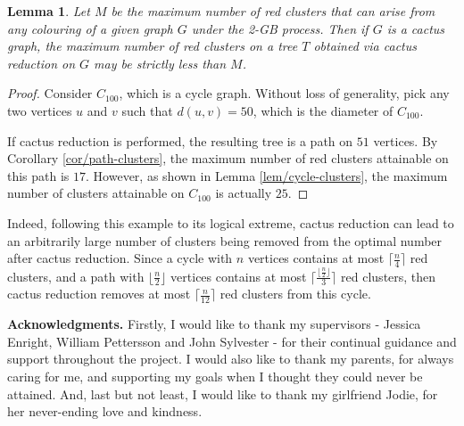 \documentclass{mpaper}
\newtheorem{lemma}[theorem]{Lemma}
\begin{document}
\begin{lemma}
  Let $M$ be the maximum number of red clusters that can arise from any colouring of a given graph $G$ under the 2-GB process. Then if $G$ is a cactus graph, the maximum number of red clusters on a tree $T$ obtained via cactus reduction on $G$ may be strictly less than $M$.
\end{lemma}

\begin{proof}
  Consider $C_100$, which is a cycle graph. Without loss of generality, pick any two vertices $u$ and $v$ such that $d(u,v) = 50$, which is the diameter of $C_100$.

  If cactus reduction is performed, the resulting tree is a path on $51$ vertices. By Corollary \ref{cor/path-clusters}, the maximum number of red clusters attainable on this path is $17$. However, as shown in Lemma \ref{lem/cycle-clusters}, the maximum number of clusters attainable on $C_100$ is actually $25$.

\end{proof}

Indeed, following this example to its logical extreme, cactus reduction can lead to an arbitrarily large number of clusters being removed from the optimal number after cactus reduction. Since a cycle with $n$ vertices contains at most $\lceil \frac{n}{4} \rceil$ red clusters, and a path with $\lfloor \frac{n}{2} \rfloor$ vertices contains at most $\lceil \frac{\lfloor \frac{n}{2} \rfloor}{3} \rceil$ red clusters, then cactus reduction removes at most $\lceil \frac{n}{12} \rceil$ red clusters from this cycle.


{\bf Acknowledgments.}
Firstly, I would like to thank my supervisors - Jessica Enright, William Pettersson and John Sylvester - for their continual guidance and support throughout the project. I would also like to thank my parents, for always caring for me, and supporting my goals when I thought they could never be attained. And, last but not least, I would like to thank my girlfriend Jodie, for her never-ending love and kindness.



\end{document}
